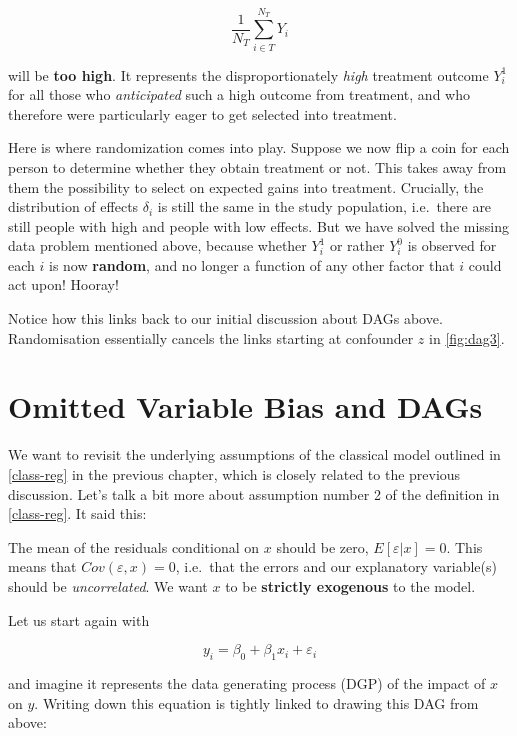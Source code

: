 \documentclass[]{book}
\newenvironment{warning}{\begin{tcolorbox}[colback=orange!5!white,colframe=orange]}{\end{tcolorbox}}
\begin{document}
\[
\frac{1}{N_T} \sum_{i \in T}^{N_T} Y_i
\]

will be \textbf{too high}. It represents the disproportionately
\emph{high} treatment outcome \(Y_i^1\) for all those who
\emph{anticipated} such a high outcome from treatment, and who therefore
were particularly eager to get selected into treatment.

Here is where randomization comes into play. Suppose we now flip a coin
for each person to determine whether they obtain treatment or not. This
takes away from them the possibility to select on expected gains into
treatment. Crucially, the distribution of effects \(\delta_i\) is still
the same in the study population, i.e.~there are still people with high
and people with low effects. But we have solved the missing data problem
mentioned above, because whether \(Y_i^1\) or rather \(Y_i^0\) is
observed for each \(i\) is now \textbf{random}, and no longer a function
of any other factor that \(i\) could act upon! Hooray!

Notice how this links back to our initial discussion about DAGs above.
Randomisation essentially cancels the links starting at confounder \(z\)
in \ref{fig:dag3}.

\section{Omitted Variable Bias and
DAGs}\label{omitted-variable-bias-and-dags}

We want to revisit the underlying assumptions of the classical model
outlined in \ref{class-reg} in the previous chapter, which is closely
related to the previous discussion. Let's talk a bit more about
assumption number 2 of the definition in \ref{class-reg}. It said this:

\begin{warning}
The mean of the residuals conditional on \(x\) should be zero,
\(E[\varepsilon|x] = 0\). This means that \(Cov(\varepsilon,x) = 0\),
i.e.~that the errors and our explanatory variable(s) should be
\emph{uncorrelated}. We want \(x\) to be \textbf{strictly exogenous} to
the model.
\end{warning}

Let us start again with

\begin{equation}
y_i = \beta_0 + \beta_1 x_i + \varepsilon_i \label{eq:DGP-h}
\end{equation}

and imagine it represents the data generating process (DGP) of the
impact of \(x\) on \(y\). Writing down this equation is tightly linked
to drawing this DAG from above:
\end{document}
